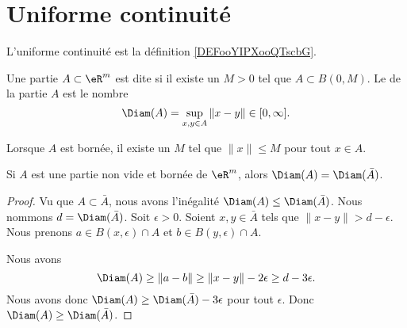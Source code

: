 
\section{Uniforme continuité}
\label{SECooZSZMooBYSDFO}
\label{SecUnifContinue}

L'uniforme continuité est la définition \ref{DEFooYIPXooQTscbG}.

\begin{definition}
	Une partie \( A\subset\eR^m\) est dite  si il existe un \( M>0\) tel que \( A\subset B(0,M)\). Le  de la partie \( A\) est le nombre
	\begin{equation}
		\Diam(A)=\sup_{x,y\in A}\| x-y \|\in\mathopen[ 0 , \infty \mathclose].
	\end{equation}
\end{definition}
Lorsque \( A\) est bornée, il existe un \( M\) tel que \( \| x \|\leq M\) pour tout \( x\in A\).

\begin{lemma}       \label{LEMooFABOooZYFjhv}
	Si \( A\) est une partie non vide et bornée de \( \eR^m\), alors \( \Diam(A)=\Diam(\bar A)\).
\end{lemma}

\begin{proof}
	Vu que \( A\subset \bar A\), nous avons l'inégalité \( \Diam(A)\leq \Diam(\bar A)\). Nous nommons \( d=\Diam(\bar A)\). Soit \( \epsilon>0\). Soient \( x,y\in\bar A\) tels que \( \| x-y \|>d-\epsilon\). Nous prenons \( a\in B(x,\epsilon)\cap A\) et \( b\in B(y,\epsilon)\cap A\).

	Nous avons
	\begin{equation}
		\Diam(A)\geq \| a-b \|\geq \| x-y \|-2\epsilon\geq d-3\epsilon.
	\end{equation}
	Nous avons donc \( \Diam(A)\geq \Diam(\bar A)-3\epsilon\) pour tout \( \epsilon\). Donc \( \Diam(A)\geq \Diam(\bar A)\).
\end{proof}

